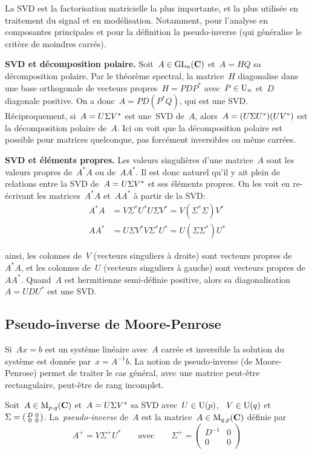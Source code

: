 \bigskip

La SVD est la factorisation matricielle la plus importante, et la plus
utilisée en traitement du signal et en modélisation.  Notamment, pour
l'analyse en composantes principales et pour la définition la pseudo-inverse
(qui généralise le critère de moindres carrés).

{\bf SVD et décomposition polaire.}
Soit~$A\in\mathrm{GL}_n(\mathbf{C})$ et~$A=HQ$ sa décomposition polaire.  Par le théorème
spectral, la matrice~$H$ diagonalise dans une base orthogonale de vecteurs
propres~$H=PDP^*$ avec~$P\in\mathrm{U}_n$ et~$D$ diagonale positive.  On a
donc~$A=PD(P^*Q)$, qui est une SVD.
Réciproquement, si~$A=U\/\Sigma V^*$ est une~SVD de~$A$,
alors~$A=(U\/\Sigma U^*)(UV^*)$ est la décomposition polaire de~$A$.  Ici on
voit que la décomposition polaire est possible pour matrices quelconque, pas
forcément inversibles ou même carrées.

{\bf SVD et éléments propres.}
Les valeurs singulières d'une matrice~$A$ sont les valeurs propres de~$A^*A$
ou de~$AA^*$.  Il est donc naturel qu'il y ait plein de relations entre
la SVD de~$A=U\/\Sigma V^*$ et ses éléments propres.  On les voit en re-écrivant
les matrices~$A^*A$ et~$AA^*$ à partir de la SVD:
\begin{align*}
	A^*A & = V\Sigma^*U^* U\Sigma V^* = V(\Sigma^*\Sigma)V^* \\
	AA^* & = U\Sigma V^* V\Sigma^* U^* = U(\Sigma\Sigma^*)U^*
\end{align*}

ainsi, les colonnes de~$V$ (vecteurs singuliers à droite) sont vecteurs
propres de~$A^*A$, et les colonnes de~$U$ (vecteurs singuliers à gauche) sont
vecteurs propres de~$AA^*$.
Quand~$A$ est hermitienne semi-définie positive, alors sa
diagonalisation~$A=UDU^*$ est une SVD.


\subsection{Pseudo-inverse de Moore-Penrose}

Si~$Ax=b$ est un système linéaire avec~$A$ carrée et inversible la solution
du système est donnée par~$x=A^{-1}b$.  La notion de pseudo-inverse (de
Moore-Penrose) permet de traiter le cas général, avec une matrice peut-être
rectangulaire, peut-être de rang incomplet.

\begin{definition}
	\label{def:pseudoinv}
	Soit~$A\in\mathrm{M}_{p,q}(\mathbf{C})$ et~$A=U\/\Sigma V^*$ sa SVD
	avec~$U\in\mathrm{U}(p)$, ~$V\in\mathrm{U}(q)$
	et~$\Sigma=\left(\begin{smallmatrix}D&0\\0&0\end{smallmatrix}\right)$.
	La~\emph{pseudo-inverse} de~$A$ est la matrice~$A\in\mathrm{M}_{q,p}(\mathbf{C})$ définie
	par
	\[
		A^+=V\Sigma^+ U^*
		\qquad
		\textrm{avec}
		\qquad
		\Sigma^+=\begin{pmatrix}D^{-1}&0\\0&0\end{pmatrix}
	\]
\end{definition}

